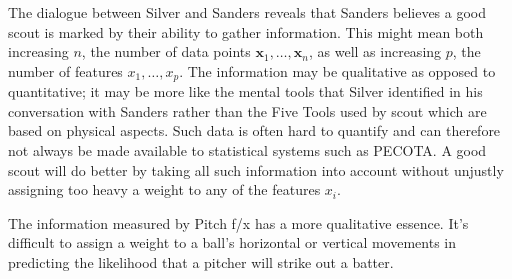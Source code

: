 \documentclass[12pt]{article}
\begin{document}
\begin{enumerate}

The dialogue between Silver and Sanders reveals that Sanders believes a good scout
is marked by their ability to gather information. This might mean both increasing $n$,
the number of data points $\mathbf{x}_1,\ldots,\mathbf{x}_n$, as well as increasing $p$,
the number of features $x_1,\ldots,x_p$. The information may be qualitative as
opposed to quantitative; it may be more like the mental tools that Silver identified in
his conversation with Sanders rather than the Five Tools used by scout which are
based on physical aspects. Such data is often hard to quantify and can therefore not always
be made available to statistical systems such as PECOTA. A good scout will do
better by taking all such information into account without unjustly assigning too heavy
a weight to any of the features $x_i$.


The information measured by Pitch f/x has a more qualitative essence. It's difficult to
assign a weight to a ball's horizontal or vertical movements in predicting the likelihood
that a pitcher will strike out a batter.

\end{enumerate}



\end{document}
